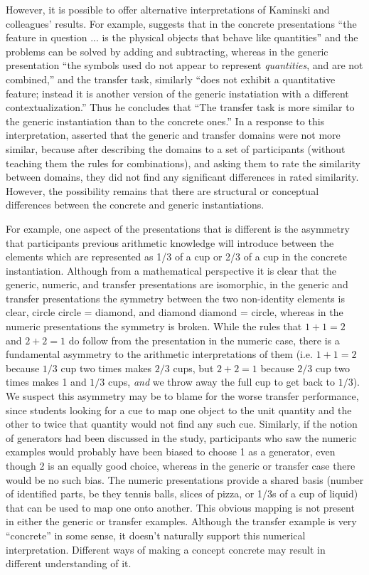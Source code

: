 \documentclass[man,10pt]{apa6}
\begin{document}
\noindent
However, it is possible to offer alternative interpretations of Kaminski and colleagues' results. For example,  suggests that in the concrete presentations ``the feature in question ... is the physical objects that behave like quantities'' and the problems can be solved by adding and subtracting, whereas in the generic presentation ``the symbols used do not appear to represent \emph{quantities}, and are not combined,'' and the transfer task, similarly ``does not exhibit a quantitative feature; instead it is another version of the generic instatiation with a different contextualization.'' Thus he concludes that ``The transfer task is more similar to the generic instantiation than to the concrete ones.'' In a response to this interpretation,  asserted that the generic and transfer domains were not more similar, because after describing the domains to a set of participants (without teaching them the rules for combinations), and asking them to rate the similarity between domains, they did not find any significant differences in rated similarity. However, the possibility remains that there are structural or conceptual differences between the concrete and generic instantiations. \par
For example, one aspect of the presentations that is different is the asymmetry that participants previous arithmetic knowledge will introduce between the elements which are represented as 1/3 of a cup or 2/3 of a cup in the concrete instantiation. Although from a mathematical perspective it is clear that the generic, numeric, and transfer presentations are isomorphic, in the generic and transfer presentations the symmetry between the two non-identity elements is clear, circle circle = diamond, and diamond diamond = circle, whereas in the numeric presentations the symmetry is broken. While the rules that $1+1=2$ and $2+2=1$ do follow from the presentation in the numeric case, there is a fundamental asymmetry to the arithmetic interpretations of them (i.e. $1+1 = 2$ because $1/3$ cup two times makes $2/3$ cups, but $2+2 = 1$ because $2/3$ cup two times makes 1 and $1/3$ cups, \emph{and} we throw away the full cup to get back to $1/3$). We suspect this asymmetry may be to blame for the worse transfer performance, since students looking for a cue to map one object to the unit quantity and the other to twice that quantity would not find any such cue. Similarly, if the notion of generators had been discussed in the study, participants who saw the numeric examples would probably have been biased to choose 1 as a generator, even though 2 is an equally good choice, whereas in the generic or transfer case there would be no such bias. The numeric presentations provide a shared basis (number of identified parts, be they tennis balls, slices of pizza, or 1/3s of a cup of liquid) that can be used to map one onto another. This obvious mapping is not present in either the generic or transfer examples. Although the transfer example is very ``concrete'' in some sense, it doesn't naturally support this numerical interpretation. Different ways of making a concept concrete may result in different understanding of it.\par
\end{document}
